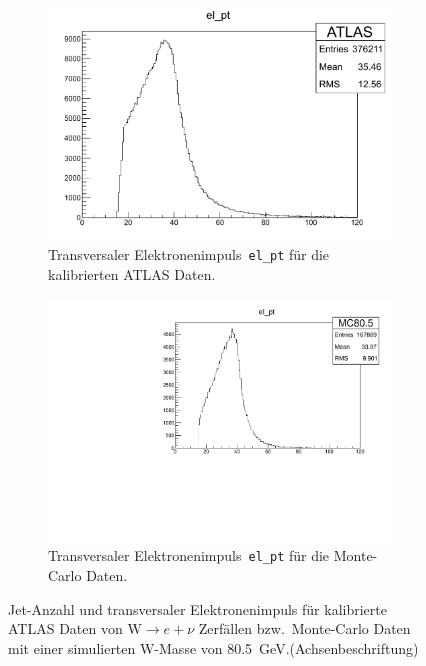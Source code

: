 \documentclass[11pt, a4paper]{article}
\numberwithin{equation}{section}
\newcommand{\korr}[1]{{\color{red}(#1)}}
\begin{document}
\begin{figure}
\begin{subfigure}{.49\textwidth}
	\end{subfigure}
	\begin{subfigure}{.49\textwidth}
		\centering
		\includegraphics[width=.7\textwidth]{./data/root/wmass/exercise1/ATLAS_el_pt.pdf}
		\caption{Transversaler Elektronenimpuls~\texttt{el\_pt} für die kalibrierten ATLAS Daten.}
	\end{subfigure}
	\begin{subfigure}{.49\textwidth}
		\centering
		\includegraphics[width=.7\textwidth]{./data/root/wmass/exercise1/MC_el_pt.pdf}
		\caption{Transversaler Elektronenimpuls~\texttt{el\_pt} für die Monte-Carlo Daten.}
	\end{subfigure}
	\caption{Jet-Anzahl und transversaler Elektronenimpuls für kalibrierte ATLAS Daten von $\mathrm{W} \rightarrow e + \nu$ Zerfällen bzw.\ Monte-Carlo Daten mit einer simulierten W-Masse von \SI{80,5}{GeV}.\korr{Achsenbeschriftung}}
	\label{fig:observablen_pt1}
\end{figure}
\end{document}
